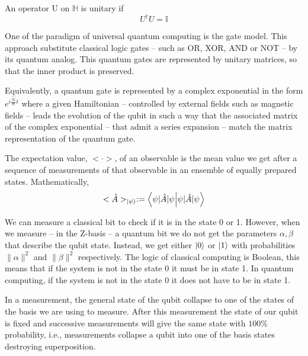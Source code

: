 \begin{definition}
    An operator U on $\mathbb{H}$ is unitary if
    \begin{equation}
        U^{\dagger}U =\mathbb{I}
    \end{equation}
\end{definition}
\begin{flushleft}
   One of the paradigm of universal quantum computing is the gate model. This approach substitute classical logic gates -- such as OR, XOR, AND or NOT -- by its quantum analog. This quantum gates are represented by unitary matrices, so that the inner product is preserved.
\end{flushleft}
\begin{flushleft}
Equivalently, a quantum gate is represented by a complex exponential in the form $e^{i\frac{\hat{\mathcal{H}}}{\hbar}t}$ where a given Hamiltonian -- controlled by external fields such as magnetic fields -- leads the evolution of the qubit in such a way that the associated matrix of the complex exponential -- that admit a series expansion -- match the matrix representation of the quantum gate.
\end{flushleft}
\begin{definition}
    The expectation value, $<\cdot>$, of an observable is the mean value we get after a sequence of measurements of that observable in an ensemble of equally prepared states.
        Mathematically,
    \begin{equation}
        <\hat{A}>_{\ket{\psi}} := \braket{\psi |\hat{A}| \psi}
    \end{equation}
\end{definition}
\begin{flushleft}
We can measure a classical bit to check if it is in the state 0 or 1. However, when we measure -- in the Z-basis -- a quantum bit we do not get the parameters $\alpha, \beta$ that describe the qubit state. Instead, we get either $\ket{0}$ or $\ket{1}$ with probabilities $\|\alpha\|^{2}$ and $\|\beta\|^{2}$ respectively. The logic of classical computing is Boolean, this means that if the system is not in the state 0 it must be in state 1. In quantum computing, if the system is not in the state 0 it does not have to be in state 1.   
\end{flushleft}
In a measurement, the general state of the qubit collapse to one of the states of the basis we are using to measure. After this measurement the state of our qubit is fixed and successive measurements will give the same state with $100\%$ probability, i.e., measurements collapse a qubit into one of the basis states destroying superposition.
